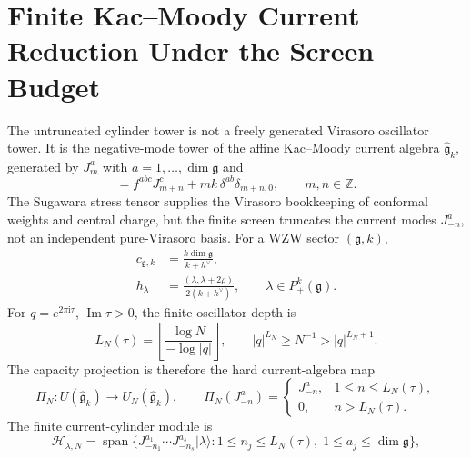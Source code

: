 \documentclass[11pt]{article}
\newcommand{\ii}{\mathrm{i}}
\newcommand{\hilb}{\mathcal{H}}
\begin{document}
\section{Finite Kac--Moody Current Reduction Under the Screen Budget}

The untruncated cylinder tower is not a freely generated Virasoro oscillator tower.  It is the negative-mode tower of the affine Kac--Moody current algebra \(\widehat{\mathfrak{g}}_k\), generated by \(J^a_m\) with \(a=1,\ldots,\dim\mathfrak{g}\) and
\begin{equation}
  [J^a_m,J^b_n]
  = f^{abc} J^c_{m+n}+m k\,\delta^{ab}\delta_{m+n,0},
  \qquad m,n\in\mathbb{Z}.
  \label{eq:current-algebra}
\end{equation}
The Sugawara stress tensor supplies the Virasoro bookkeeping of conformal weights and central charge, but the finite screen truncates the current modes \(J^a_{-n}\), not an independent pure-Virasoro basis.  For a WZW sector \((\mathfrak{g},k)\),
\begin{equation}
\begin{aligned}
  c_{\mathfrak{g},k}
    &=\frac{k\dim\mathfrak{g}}{k+h^\vee},\\
  h_\lambda
    &=\frac{(\lambda,\lambda+2\rho)}{2(k+h^\vee)},
    \qquad \lambda\in P_+^k(\mathfrak{g}).
\end{aligned}
\label{eq:central-charge-weight}
\end{equation}
For \(q=e^{2\pi\ii\tau}\), \(\operatorname{Im}\tau>0\), the finite oscillator depth is
\begin{equation}
  L_N(\tau)=\left\lfloor\frac{\log N}{-\log |q|}\right\rfloor,
  \qquad
  |q|^{L_N}\ge N^{-1}>|q|^{L_N+1}.
  \label{eq:oscillator-depth}
\end{equation}
The capacity projection is therefore the hard current-algebra map
\begin{equation}
  \Pi_N:U(\widehat{\mathfrak{g}}_k)\longrightarrow U_N(\widehat{\mathfrak{g}}_k),
  \qquad
  \Pi_N(J^a_{-n})=
  \begin{cases}
    J^a_{-n}, & 1\le n\le L_N(\tau),\\
    0, & n>L_N(\tau).
  \end{cases}
  \label{eq:current-projection}
\end{equation}
The finite current-cylinder module is
\begin{equation}
  \hilb_{\lambda,N}
  =\operatorname{span}\{J^{a_1}_{-n_1}\cdots J^{a_s}_{-n_s}|\lambda\rangle:
    1\le n_j\le L_N(\tau),\;1\le a_j\le\dim\mathfrak{g}\},
  \label{eq:finite-module}
\end{equation}
\end{document}
